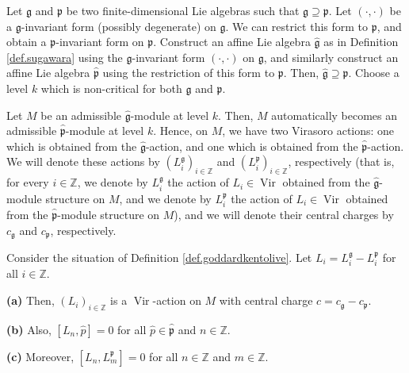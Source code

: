 \documentclass[etingof-lie.tex]{subfiles}
\begin{document}
\begin{definition}
\label{def.goddardkentolive}Let $\mathfrak{g}$ and $\mathfrak{p}$ be two
finite-dimensional Lie algebras such that $\mathfrak{g}\supseteq\mathfrak{p}$.
Let $\left(  \cdot,\cdot\right)  $ be a $\mathfrak{g}$-invariant form
(possibly degenerate) on $\mathfrak{g}$. We can restrict this form to
$\mathfrak{p}$, and obtain a $\mathfrak{p}$-invariant form on $\mathfrak{p}$.
Construct an affine Lie algebra $\widehat{\mathfrak{g}}$ as in Definition
\ref{def.sugawara} using the $\mathfrak{g}$-invariant form $\left(
\cdot,\cdot\right)  $ on $\mathfrak{g}$, and similarly construct an affine Lie
algebra $\widehat{\mathfrak{p}}$ using the restriction of this form to
$\mathfrak{p}$. Then, $\widehat{\mathfrak{g}}\supseteq\widehat{\mathfrak{p}}$.
Choose a level $k$ which is non-critical for both $\mathfrak{g}$ and
$\mathfrak{p}$.

Let $M$ be an admissible $\widehat{\mathfrak{g}}$-module at level $k$. Then,
$M$ automatically becomes an admissible $\widehat{\mathfrak{p}}$-module at
level $k$. Hence, on $M$, we have two Virasoro actions: one which is obtained
from the $\widehat{\mathfrak{g}}$-action, and one which is obtained from the
$\widehat{\mathfrak{p}}$-action. We will denote these actions by $\left(
L_{i}^{\mathfrak{g}}\right)  _{i\in\mathbb{Z}}$ and $\left(  L_{i}%
^{\mathfrak{p}}\right)  _{i\in\mathbb{Z}}$, respectively (that is, for every
$i\in\mathbb{Z}$, we denote by $L_{i}^{\mathfrak{g}}$ the action of $L_{i}%
\in\operatorname*{Vir}$ obtained from the $\widehat{\mathfrak{g}}$-module
structure on $M$, and we denote by $L_{i}^{\mathfrak{p}}$ the action of
$L_{i}\in\operatorname*{Vir}$ obtained from the $\widehat{\mathfrak{p}}%
$-module structure on $M$), and we will denote their central charges by
$c_{\mathfrak{g}}$ and $c_{\mathfrak{p}}$, respectively.
\end{definition}

\begin{theorem}
\label{thm.goddardkentolive}Consider the situation of Definition
\ref{def.goddardkentolive}. Let $L_{i}=L_{i}^{\mathfrak{g}}-L_{i}%
^{\mathfrak{p}}$ for all $i\in\mathbb{Z}$.

\textbf{(a)} Then, $\left(  L_{i}\right)  _{i\in\mathbb{Z}}$ is a
$\operatorname*{Vir}$-action on $M$ with central charge $c=c_{\mathfrak{g}%
}-c_{\mathfrak{p}}$.

\textbf{(b)} Also, $\left[  L_{n},\widehat{p}\right]  =0$ for all
$\widehat{p}\in\widehat{\mathfrak{p}}$ and $n\in\mathbb{Z}$.

\textbf{(c)} Moreover, $\left[  L_{n},L_{m}^{\mathfrak{p}}\right]  =0$ for all
$n\in\mathbb{Z}$ and $m\in\mathbb{Z}$.
\end{theorem}
\end{document}
